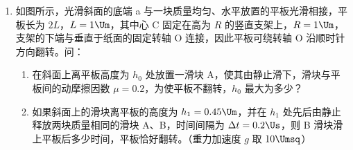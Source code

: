 \documentclass[\gkver]{gaokaozhenti}
\begin{document}
\begin{enumerate}
{两灯的电阻相等，故灯 $L_{1}$ 的功率为

$P_{1}=\frac{\left(\frac{E_{2}}{2}\right)^{2}}{R}=1.28\times10^{-2}\UW$ ④

评分标准：全题 13 分。第（1）小题 6 分，第（2）小题 7 分。其中（1）正确得出①式得 3 分，得出②式得 3 分；（2）得出③式 4 分，得出④式得 3 分。
}

\item
如图所示，光滑斜面的底端 a 与一块质量均匀、水平放置的平板光滑相接，平板长为 $2L$，$L=1\Um$，其中心 C 固定在高为 $R$ 的竖直支架上，$R=1\Um$，支架的下端与垂直于纸面的固定转轴 O 连接，因此平板可绕转轴 O 沿顺时针方向翻转。问：
\begin{enumerate}
	\item
	在斜面上离平板高度为 $h_{0}$ 处放置一滑块 A，使其由静止滑下，滑块与平板间的动摩擦因数 $\mu=0.2$，为使平板不翻转，$h_{0}$ 最大为多少？
	\item
	如果斜面上的滑块离平板的高度为 $h_{1}=0.45\Um$，并在 $h_{1}$ 处先后由静止释放两块质量相同的滑块 A、B，时间间隔为 $\Delta t=0.2\Us$，则 B 滑块滑上平板后多少时间，平板恰好翻转。（重力加速度 $g$ 取 $10\Umsq$）
\end{enumerate}

\onepicture[align=right, w=6.73cm]{}

\end{enumerate}
\end{document}
